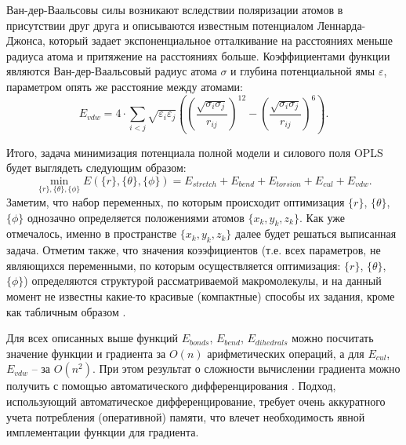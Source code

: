   Ван-дер-Ваальсовы силы возникают вследствии поляризации атомов в присутствии друг друга и описываются известным потенциалом Леннарда-Джонса, который задает экспоненциальное отталкивание на расстояниях меньше радиуса атома и притяжение на расстояниях больше.
  Коэффициентами функции являются Ван-дер-Ваальсовый радиус атома $\sigma$ и глубина потенциальной ямы $\varepsilon$, параметром опять же расстояние между атомами:
  $$
  E_{vdw} = 4 \cdot \sum_{i < j} \sqrt{\varepsilon_i \varepsilon_j} \left( \left( \frac{\sqrt{\sigma_i \sigma_j}}{r_{ij}} \right)^{12} - \left( \frac{\sqrt{\sigma_i \sigma_j}}{r_{ij}} \right)^{6} \right).
  $$

  Итого, задача минимизация потенциала полной модели и силового поля OPLS будет выглядеть следующим образом:
  $$
  \min_{\{r\},\{\theta\},\{\phi\}} {E(\{r\},\{\theta\},\{\phi\}) = E_{stretch} + E_{bend} + E_{torsion} + E_{cul} + E_{vdw}}.
  $$
  Заметим, что набор переменных, по которым происходит оптимизация $\{r\}$, $\{\theta\}$, $\{\phi\}$ однозачно определяется положениями атомов $\{x_k ,y_k ,z_k\}$. Как уже отмечалось, именно в пространстве $\{x_k ,y_k ,z_k\}$ далее будет решаться выписанная задача. Отметим также, что значения коээфициентов (т.е. всех параметров, не являющихся переменными, по которым осуществляется оптимизация: $\{r\}$, $\{\theta\}$, $\{\phi\}$) определяются структурой рассматриваемой макромолекулы, и на данный момент не известны какие-то красивые (компактные) способы их задания, кроме как табличным образом \cite{Jorgensen1996}.


  Для всех описанных выше функций $E_{bonds}$, $E_{bend}$, $E_{dihedrals}$ можно посчитать значение функции и градиента за ${O}\left( n \right)$ арифметических операций, а для $E_{cul}$, $E_{vdw}$ -- за ${O}\left( n^2 \right)$.
  При этом результат о сложности вычислении градиента можно получить с помощью автоматического дифференцирования \cite{nocedal2006sequential}. Подход, использующий автоматическое дифференцирование, требует очень аккуратного учета потребления (оперативной) памяти, что влечет необходимость явной имплементации функции для градиента.

